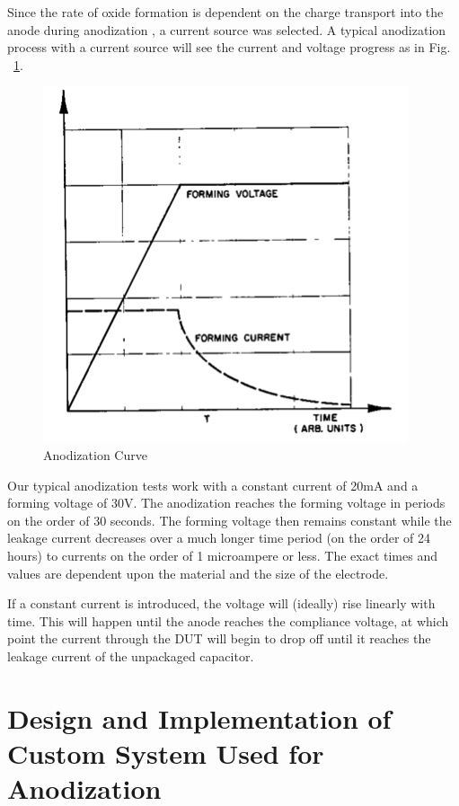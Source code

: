 \documentclass[journal]{IEEEtran}
\begin{document}
Since the rate of oxide formation is dependent on the charge transport into the anode during anodization \cite{tiMinit}, a current source was selected. A typical anodization process with a current source will see the current and voltage progress as in Fig. ~\ref{fig:anodCurve}.


\begin{figure}[here]
\centering
\includegraphics{anodCurve}
\caption{Anodization Curve \cite{tiMinit}}
\label{fig:anodCurve}
\end{figure}

Our typical anodization tests work with a constant current of 20mA and a forming voltage of 30V. The anodization reaches the forming voltage in periods on the order of 30 seconds. The forming voltage then remains constant while the leakage current decreases over  a much longer time period (on the order of 24 hours) to currents on the order of 1 microampere or less. The exact times and values are dependent upon the material and the size of the electrode.

If a constant current is introduced, the voltage will (ideally) rise linearly with time. This will happen until the anode reaches the compliance voltage, at which point the current through the DUT will begin to drop off until it reaches the leakage current of the unpackaged capacitor. 

\section{Design and Implementation of Custom System Used for Anodization}
\end{document}
